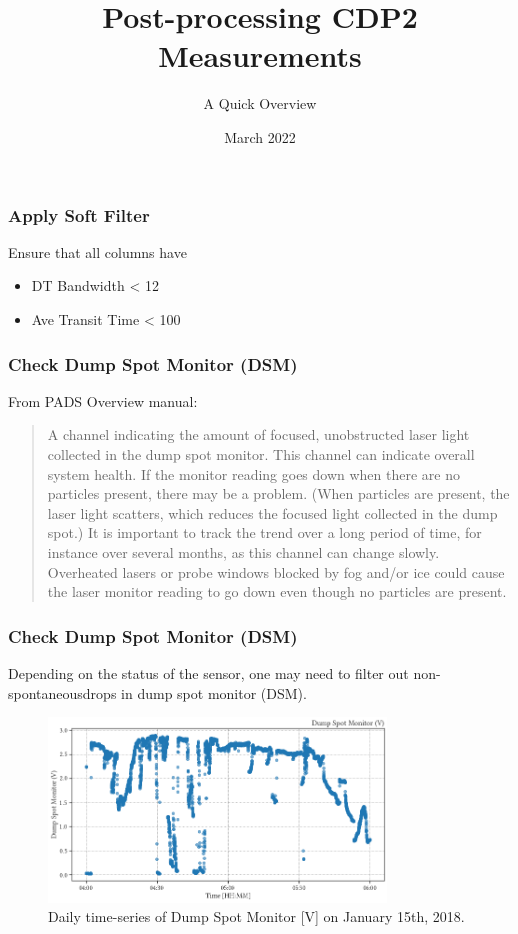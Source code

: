 \documentclass{beamer}
\title{Post-processing CDP2 Measurements}
\subtitle{A Quick Overview}
\date{March 2022}
\begin{document}
\frame{\titlepage}

\begin{frame}
    \frametitle{Apply Soft Filter}
    Ensure that all columns have

    \begin{itemize}
        \item DT Bandwidth < 12
        \item Ave Transit Time < 100\footnotemark
    \end{itemize}

\end{frame}

\begin{frame}
    \frametitle{Check Dump Spot Monitor (DSM)}
    From PADS Overview manual:

    \begin{quote}
        \small{A channel indicating the amount of focused, unobstructed laser light collected in the dump spot monitor. This channel can indicate overall system health. If the monitor reading goes down when there are no particles present, there may be a problem. (When particles are present, the laser light scatters, which reduces the focused light collected in the dump spot.) It is important to track the trend over a long period of time, for instance over several months, as this channel can change slowly. Overheated lasers or probe windows blocked by fog and/or ice could cause the laser monitor reading to go down even though no particles are present.}
    \end{quote}
\end{frame}

\begin{frame}
    \frametitle{Check Dump Spot Monitor (DSM)}
    Depending on the status of the sensor, one may need to filter out non-spontaneous\footnotemark drops in dump spot monitor (DSM).

    \begin{figure}
        \centering
        \includegraphics[width=0.8\textwidth]{img/dsm.png}
        \caption{Daily time-series of Dump Spot Monitor [V] on January 15th, 2018.}
    \end{figure}

\end{frame}
\end{document}
